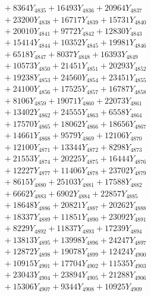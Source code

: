 \documentclass[a4paper,10pt]{article}
\begin{document}
{\begin{align}
&\;  + 8364 Y_{4835} + 16493 Y_{4836} + 20964 Y_{4837} \\[0.3ex]
&\;  + 23200 Y_{4838} + 16717 Y_{4839} + 15731 Y_{4840} \\[0.3ex]
&\;  + 20010 Y_{4841} + 9772 Y_{4842} + 12830 Y_{4843} \\[0.3ex]
&\;  + 15414 Y_{4844} + 10352 Y_{4845} + 19981 Y_{4846} \\[0.3ex]
&\;  + 6518 Y_{4847} + 8037 Y_{4848} + 16393 Y_{4849} \\[0.3ex]
&\;  + 10573 Y_{4850} + 21451 Y_{4851} + 20293 Y_{4852} \\[0.3ex]
&\;  + 19238 Y_{4853} + 24560 Y_{4854} + 23451 Y_{4855} \\[0.3ex]
&\;  + 24100 Y_{4856} + 17525 Y_{4857} + 16787 Y_{4858} \\[0.5ex]\allowbreak
&\;  + 8106 Y_{4859} + 19071 Y_{4860} + 22073 Y_{4861} \\[0.3ex]
&\;  + 13402 Y_{4862} + 24555 Y_{4863} + 6558 Y_{4864} \\[0.3ex]
&\;  + 17570 Y_{4865} + 18062 Y_{4866} + 18656 Y_{4867} \\[0.3ex]
&\;  + 14661 Y_{4868} + 9579 Y_{4869} + 12106 Y_{4870} \\[0.3ex]
&\;  + 12100 Y_{4871} + 13344 Y_{4872} + 8298 Y_{4873} \\[0.3ex]
&\;  + 21553 Y_{4874} + 20225 Y_{4875} + 16444 Y_{4876} \\[0.3ex]
&\;  + 12227 Y_{4877} + 11406 Y_{4878} + 23702 Y_{4879} \\[0.3ex]
&\;  + 8615 Y_{4880} + 25103 Y_{4881} + 17588 Y_{4882} \\[0.3ex]
&\;  + 6662 Y_{4883} + 6902 Y_{4884} + 22857 Y_{4885} \\[0.3ex]
&\;  + 18648 Y_{4886} + 20821 Y_{4887} + 20262 Y_{4888} \\[0.5ex]\allowbreak
&\;  + 18337 Y_{4889} + 11851 Y_{4890} + 23092 Y_{4891} \\[0.3ex]
&\;  + 8229 Y_{4892} + 11837 Y_{4893} + 17239 Y_{4894} \\[0.3ex]
&\;  + 13813 Y_{4895} + 13998 Y_{4896} + 24247 Y_{4897} \\[0.3ex]
&\;  + 12872 Y_{4898} + 19078 Y_{4899} + 12424 Y_{4900} \\[0.3ex]
&\;  + 10915 Y_{4901} + 17704 Y_{4902} + 11535 Y_{4903} \\[0.3ex]
&\;  + 23043 Y_{4904} + 23894 Y_{4905} + 21288 Y_{4906} \\[0.3ex]
&\;  + 15306 Y_{4907} + 9344 Y_{4908} + 10925 Y_{4909} \\[0.3ex]

\end{align}}
\end{document}
